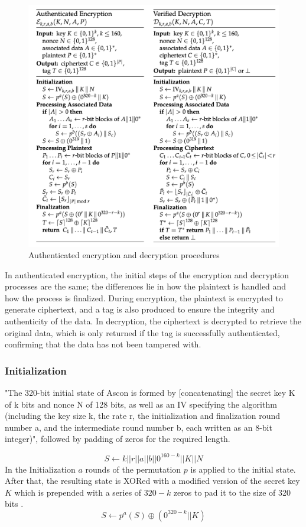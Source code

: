 \begin{figure}[H]
    \centering
    \includegraphics[width=1\textwidth]{figures/alg.png}
    \caption{Authenticated encryption and decryption procedures \cite{DBLP:journals/joc/DobraunigEMS21}}
    \label{fig:procedure}
\end{figure}

In authenticated encryption, the initial steps of the encryption and decryption processes are the same; the differences lie in how the plaintext is handled and how the process is finalized. During encryption, the plaintext is encrypted to generate ciphertext, and a tag is also produced to ensure the integrity and authenticity of the data. In decryption, the ciphertext is decrypted to retrieve the original data, which is only returned if the tag is successfully authenticated, confirming that the data has not been tampered with. \par

\subsubsection{Initialization}
"The 320-bit initial state of Ascon is formed by [concatenating] the secret key K of k bits and nonce N of 128 bits, as well as an IV specifying the algorithm (including the key size k, the rate r, the initialization and finalization round number a, and the intermediate round number b, each written as an 8-bit integer)", followed by padding of zeros for the required length. \par
$$S \leftarrow k || r || a || b || 0^{160-k} || K || N $$
In the Initialization $a$ rounds of the permutation $p$ is applied to the initial state. After that, the resulting state is XORed with a modified version of the secret key $K$ which is prepended with a series of $320-k$ zeros to pad it to the size of 320 bits \cite{DBLP:journals/joc/DobraunigEMS21}.
$$S \leftarrow p^a(S) \oplus (0^{320-k} || K)$$

